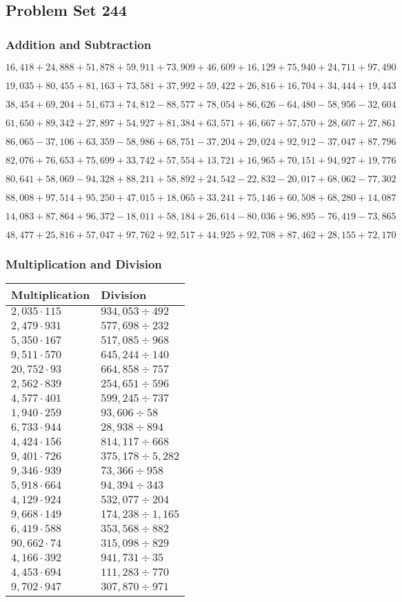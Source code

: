 \hypertarget{problem-set-244}{%
\subsection{Problem Set 244}\label{problem-set-244}}

\hypertarget{addition-and-subtraction}{%
\subsubsection{Addition and
Subtraction}\label{addition-and-subtraction}}

\(16,418+24,888+51,878+59,911+73,909+46,609+16,129+75,940+24,711+97,490\)

\(19,035+80,455+81,163+73,581+37,992+59,422+26,816+16,704+34,444+19,443\)

\(38,454+69,204+51,673+74,812-88,577+78,054+86,626-64,480-58,956-32,604\)

\(61,650+89,342+27,897+54,927+81,384+63,571+46,667+57,570+28,607+27,861\)

\(86,065-37,106+63,359-58,986+68,751-37,204+29,024+92,912-37,047+87,796\)

\(82,076+76,653+75,699+33,742+57,554+13,721+16,965+70,151+94,927+19,776\)

\(80,641+58,069-94,328+88,211+58,892+24,542-22,832-20,017+68,062-77,302\)

\(88,008+97,514+95,250+47,015+18,065+33,241+75,146+60,508+68,280+14,087\)

\(14,083+87,864+96,372-18,011+58,184+26,614-80,036+96,895-76,419-73,865\)

\(48,477+25,816+57,047+97,762+92,517+44,925+92,708+87,462+28,155+72,170\)

\hypertarget{multiplication-and-division}{%
\subsubsection{Multiplication and
Division}\label{multiplication-and-division}}

\begin{longtable}[]{@{}ll@{}}
\toprule
Multiplication & Division\tabularnewline
\midrule
\endhead
\(2,035\cdot115\) & \(934,053÷492\)\tabularnewline
\(2,479\cdot931\) & \(577,698÷ 232\)\tabularnewline
\(5,350\cdot167\) & \(517,085÷968\)\tabularnewline
\(9,511\cdot570\) & \(645,244÷140\)\tabularnewline
\(20,752\cdot93\) & \(664,858÷757\)\tabularnewline
\(2,562\cdot839\) & \(254,651÷596\)\tabularnewline
\(4,577\cdot401\) & \(599,245÷737\)\tabularnewline
\(1,940\cdot259\) & \(93,606÷58\)\tabularnewline
\(6,733\cdot944\) & \(28,938÷894\)\tabularnewline
\(4,424\cdot156\) & \(814,117÷668\)\tabularnewline
\(9,401\cdot726\) & \(375,178÷5,282\)\tabularnewline
\(9,346\cdot939\) & \(73,366÷958\)\tabularnewline
\(5,918\cdot664\) & \(94,394÷343\)\tabularnewline
\(4,129\cdot924\) & \(532,077÷204\)\tabularnewline
\(9,668\cdot149\) & \(174,238÷1,165\)\tabularnewline
\(6,419\cdot588\) & \(353,568÷882\)\tabularnewline
\(90,662\cdot74\) & \(315,098÷829\)\tabularnewline
\(4,166\cdot392\) & \(941,731÷35\)\tabularnewline
\(4,453\cdot694\) & \(111,283÷770\)\tabularnewline
\(9,702\cdot947\) & \(307,870÷971\)\tabularnewline
\bottomrule
\end{longtable}
